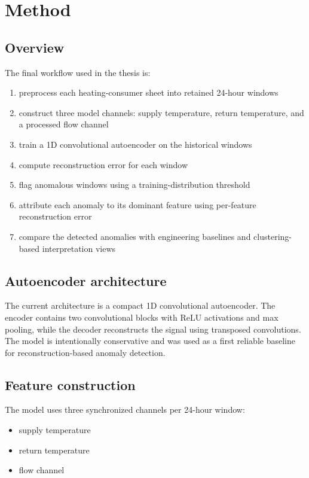 \section{Method}

\subsection{Overview}

The final workflow used in the thesis is:

\begin{enumerate}
\item preprocess each heating-consumer sheet into retained 24-hour windows
\item construct three model channels: supply temperature, return temperature, and a processed flow channel
\item train a 1D convolutional autoencoder on the historical windows
\item compute reconstruction error for each window
\item flag anomalous windows using a training-distribution threshold
\item attribute each anomaly to its dominant feature using per-feature reconstruction error
\item compare the detected anomalies with engineering baselines and clustering-based interpretation views
\end{enumerate}

\subsection{Autoencoder architecture}

The current architecture is a compact 1D convolutional autoencoder. The encoder contains two convolutional blocks with ReLU activations and max pooling, while the decoder reconstructs the signal using transposed convolutions. The model is intentionally conservative and was used as a first reliable baseline for reconstruction-based anomaly detection.

\subsection{Feature construction}

The model uses three synchronized channels per 24-hour window:

\begin{itemize}
\item supply temperature
\item return temperature
\item flow channel
\end{itemize}

